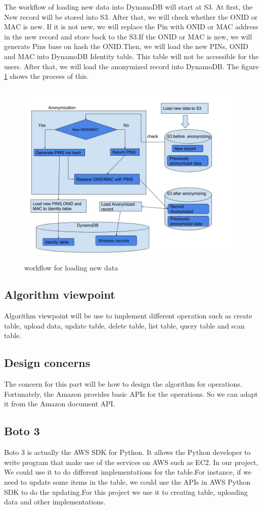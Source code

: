     \noindent The workflow of loading new data into DynamoDB will start at S3. At first, the New record will be stored into S3. After that, we will check whether the ONID or MAC is new. If it is not new, we will replace the Pin with ONID or MAC address in the new record and store back to the S3.If the ONID or MAC is new, we will generate Pins base on hash the ONID.Then, we will load the new PINs, ONID and MAC into DynamoDB Identity table. This table will not be accessible for the users. After that, we will load the anonymized record into DynamoDB. The figure \ref{fig:5} shows the process of this.
    
\begin{figure}[H]
\includegraphics[width=15cm, height=9cm]{8.jpg}
\centering
\caption{\label{fig:5} workflow for loading new data }
\end{figure}
 

    \subsection{Algorithm viewpoint}
    Algorithm viewpoint will be use to implement different operation such as create table, upload data, update table, delete table, list table, query table and scan table.
    \subsection{Design concerns}
    The concern for this part will be how to design the algorithm for operations. Fortunately, the Amazon provides basic APIs for the operations. So we can adapt it from the Amazon document API. 
    \subsection{Boto 3}
    Boto 3 is actually the AWS SDK for Python. It allows the Python developer to write program that make use of the services on AWS such as EC2. In our project, We could use it to do different implementations for the table.For instance, if we need to update some items in the table, we could use the APIs in AWS Python SDK to do the updating.For this project we use it to creating table, uploading data and other implementations.
